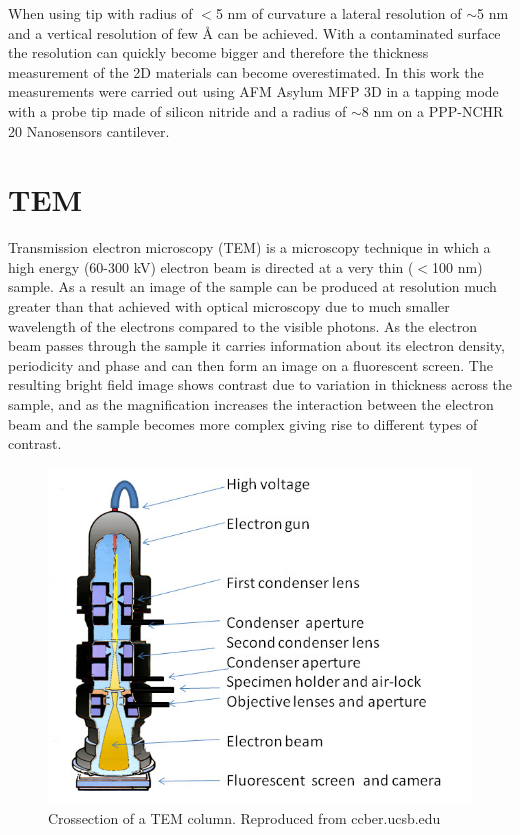 When using tip with radius of $<$5 nm of curvature a lateral resolution of $\sim$5 nm and a vertical resolution of few \r{A} can be achieved. With a contaminated surface the resolution can quickly become bigger and therefore the thickness measurement of the 2D materials can become overestimated. In this work the measurements were carried out using AFM Asylum MFP 3D in a tapping mode with a probe tip made of silicon nitride and a radius of $\sim$8 nm on a PPP-NCHR 20 Nanosensors cantilever.

\section{TEM}

Transmission electron microscopy (TEM) is a microscopy technique in which a high energy (60-300 kV) electron beam is directed at a very thin ($<$100 nm) sample. As a result an image of the sample can be produced at resolution much greater than that achieved with optical microscopy due to much smaller wavelength of the electrons compared to the visible photons. As the electron beam passes through the sample it carries information about its electron density, periodicity and phase and can then form an image on a fluorescent screen. The resulting bright field image shows contrast due to variation in thickness across the sample, and as the magnification increases the interaction between the electron beam and the sample becomes more complex giving rise to different types of contrast. 

\begin{figure}[H]
	\begin{center}
		\includegraphics[scale=0.3]{Methodology/TEMSetup.png}
		\caption{Crossection of a TEM column. Reproduced from ccber.ucsb.edu}
		\label{fig:MethodologyTEMSetup}
	\end{center}
\end{figure}

